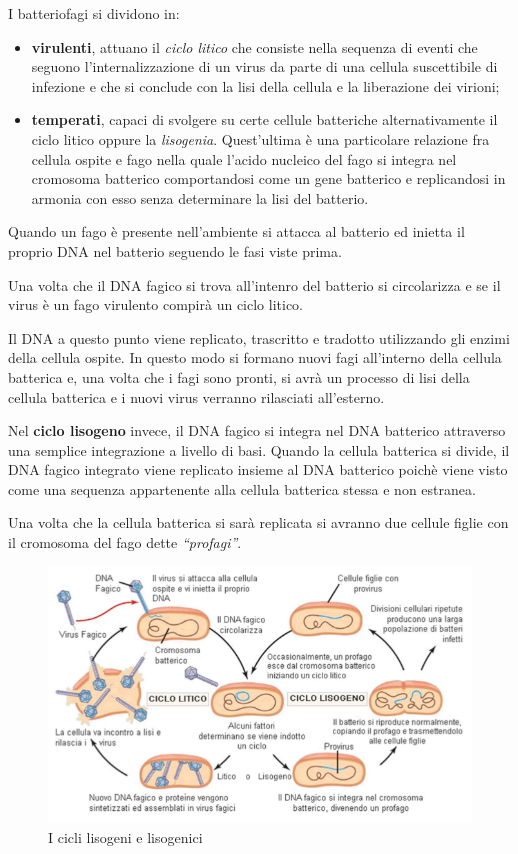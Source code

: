 \documentclass[11pt]{book}
\begin{document}
I batteriofagi si dividono in:
\begin{itemize}
\item \textbf{virulenti}, attuano il \emph{ciclo litico} che consiste nella sequenza di eventi che seguono l’internalizzazione di un virus da parte di una cellula suscettibile di infezione e che si conclude con la lisi della cellula e la liberazione dei virioni;
\item \textbf{temperati}, capaci di svolgere su certe cellule batteriche alternativamente il ciclo litico oppure la \emph{lisogenia}. Quest’ultima è una particolare relazione fra cellula ospite e fago nella quale l’acido nucleico del fago si integra nel cromosoma batterico comportandosi come un
gene batterico e replicandosi in armonia con esso senza determinare la lisi del batterio.
\end{itemize}

Quando un fago è presente nell'ambiente si attacca al batterio ed inietta il proprio DNA nel batterio seguendo le fasi viste prima. 

Una volta che il DNA fagico si trova all'intenro del batterio si circolarizza e se il virus è un fago virulento compirà un ciclo litico. 

Il DNA a questo punto viene replicato, trascritto e tradotto utilizzando gli enzimi della cellula ospite. In questo modo si formano nuovi fagi all'interno della cellula batterica e, una volta che i fagi sono pronti, si avrà un processo di lisi della cellula batterica e i nuovi virus verranno rilasciati all'esterno.
 
Nel \textbf{ciclo lisogeno} invece, il DNA fagico si integra nel DNA batterico attraverso una semplice integrazione a livello di basi. 
Quando la cellula batterica si divide, il DNA fagico integrato viene replicato insieme al DNA batterico poichè viene visto come una sequenza appartenente alla cellula batterica stessa e non estranea.

Una volta che la cellula batterica si sarà replicata si avranno due cellule figlie con il cromosoma del fago dette \emph{``profagi''}.



\begin{figure}[htp]
\centering
\includegraphics[scale=0.5]{img/Ciclo lisogeno e ciclo lisogenico.png}
\caption{I cicli lisogeni e lisogenici}
\label{}
\end{figure}
\end{document}
